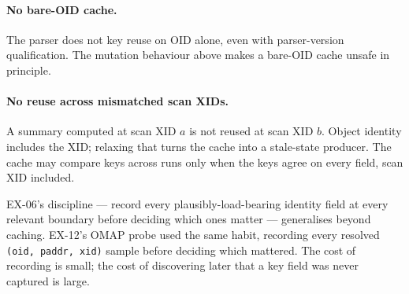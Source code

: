 \paragraph{No bare-OID cache.} The parser does not key reuse on
OID alone, even with parser-version qualification. The mutation
behaviour above makes a bare-OID cache unsafe in principle.

\paragraph{No reuse across mismatched scan XIDs.} A summary
computed at scan XID $a$ is not reused at scan XID $b$. Object
identity includes the XID; relaxing that turns the cache into a
stale-state producer. The cache may compare keys across runs only
when the keys agree on every field, scan XID included.

EX-06's discipline --- record every plausibly-load-bearing identity
field at every relevant boundary before deciding which ones matter
--- generalises beyond caching. EX-12's OMAP probe used the same
habit, recording every resolved \texttt{(oid, paddr, xid)} sample
before deciding which mattered. The cost of recording is small; the
cost of discovering later that a key field was never captured is
large.
